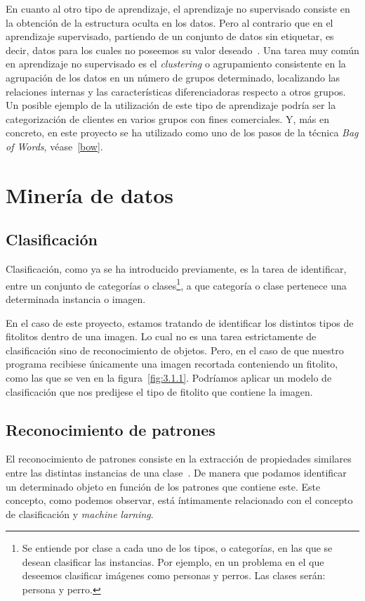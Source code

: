 En cuanto al otro tipo de aprendizaje, el aprendizaje no supervisado consiste en la obtención de la estructura oculta en los datos. Pero al contrario que en el aprendizaje supervisado, partiendo de un conjunto de datos sin etiquetar, es decir, datos para los cuales no poseemos su valor deseado~\cite{wiki:unsupervisedLearning}. Una tarea muy común en aprendizaje no supervisado es el \textit{clustering} o agrupamiento consistente en la agrupación de los datos en un número de grupos determinado, localizando las relaciones internas y las características diferenciadoras respecto a otros grupos. Un posible ejemplo  de la utilización de este tipo de aprendizaje podría ser la categorización de clientes en varios grupos con fines comerciales. Y, más en concreto, en este proyecto se ha utilizado como uno de los pasos de la técnica \textit{Bag of Words}, véase~\ref{bow}.

\section{Minería de datos}
\label{md}
\subsection{Clasificación}

Clasificación, como ya se ha introducido previamente, es la tarea de identificar, entre un conjunto de  categorías o clases\footnote{Se entiende por clase a cada uno de los tipos, o categorías, en las que se desean clasificar las instancias. Por ejemplo, en un problema en el que deseemos clasificar imágenes como personas y perros. Las clases serán: persona y perro.}, a que categoría o clase pertenece una determinada instancia o imagen.

En el caso de este proyecto, estamos tratando de identificar los distintos tipos de fitolitos dentro de una imagen. Lo cual no es una tarea estrictamente de clasificación sino de reconocimiento de objetos. Pero, en el caso de que nuestro programa recibiese únicamente una imagen recortada conteniendo un fitolito, como las que se ven en la figura~\ref{fig:3.1.1}. Podríamos aplicar un modelo de clasificación que nos predijese el tipo de fitolito que contiene la imagen.

\subsection{Reconocimiento de patrones}

El reconocimiento de patrones consiste en la extracción de propiedades similares entre las distintas instancias de una clase~\cite{wiki:patternrecognition}. De manera que podamos identificar un determinado objeto en función de los patrones que contiene este. Este concepto, como podemos observar, está íntimamente relacionado con el concepto de clasificación y \textit{machine larning}.

